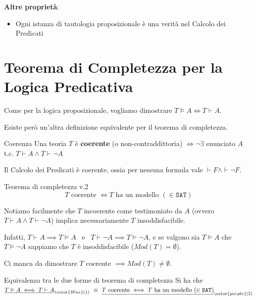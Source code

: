 \documentclass[a4paper,11pt]{report}
\newcommand{\SAT}{\texttt{SAT}}
\begin{document}
\textbf{Altre proprietà}:
\begin{itemize}
    \item  Ogni istanza di tautologia proposizionale è una verità nel Calcolo dei Predicati
\end{itemize}

\section{Teorema di Completezza per la Logica Predicativa}
Come per la logica proposizionale, vogliamo dimostrare \( T\vDash A \iff T \vdash A \).

Esiste però un'altra definizione equivalente per il teorema di completezza.

\begin{defframe}{Coerenza}{}
    Una teoria \( T \) è \textbf{coerente} (o non-contraddittoria) \(\iff \neg \exists \) enunciato \( A \) t.c. \( T \vdash A \land T\vdash \neg A \)
\end{defframe}

\begin{gframe}{}
    Il Calcolo dei Predicati è coerente, ossia per nessuna formula vale \( \vdash F \land \vdash \neg F \).
\end{gframe}

\begin{defframe}{Teorema di completezza v.2}{}
    \vspace{-1em}
    \[ T \text{ coerente } \iff T \text{ ha un modello } (\in \texttt{SAT}) \]
\end{defframe}

Notiamo facilmente che \( T \) incoerente come testimoniato da \( A \) (ovvero \( T \vdash A \land T \vdash \neg A \)) implica necessariamente \( T \) insoddisfacibile.

Infatti, \( T\vdash A \implies T\vDash A \) \ e \ \( T\vdash \neg A \implies T\vDash \neg A \), e se valgono sia \( T \vDash A\) che \(T \vDash \neg A \) sappiamo che \( T \) è insoddisfacibile (\( Mod(T) = \emptyset \)).

Ci manca da dimostrare \( T \) coerente \( \implies Mod(T) \neq \emptyset\).

\begin{thmframe}{Equivalenza tra le due forme di teorema di completezza}{}
    Si ha che \( \underline{T \vDash A \iff T \vdash A}_{\color{Blue}(1)} \ \equiv \ \underline{T \text{ coerente} \iff T \text{ ha un modello } (\in \SAT)}_{\color{purple}(2)}\)
    
\end{thmframe}
\end{document}
